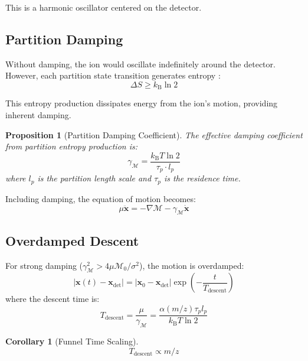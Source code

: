 \documentclass[twocolumn,10pt,a4paper]{article}
\newtheorem{proposition}[theorem]{Proposition}
\newtheorem{corollary}[theorem]{Corollary}
\theoremstyle{definition}
\theoremstyle{remark}
\newcommand{\kB}{k_{\mathrm{B}}}
\newcommand{\Mdepth}{\mathcal{M}}
\newcommand{\partinert}{\mu}
\newcommand{\taup}{\tau_p}
\newcommand{\xdet}{\mathbf{x}_{\mathrm{det}}}
\begin{document}
This is a harmonic oscillator centered on the detector.

\subsection{Partition Damping}

Without damping, the ion would oscillate indefinitely around the detector. However, each partition state transition generates entropy \citep{landauer1961}:
\begin{equation}
    \Delta S \geq \kB \ln 2
    \label{eq:landauer}
\end{equation}

This entropy production dissipates energy from the ion's motion, providing inherent damping.

\begin{proposition}[Partition Damping Coefficient]
\label{prop:damping}
The effective damping coefficient from partition entropy production is:
\begin{equation}
    \gamma_{\Mdepth} = \frac{\kB T \ln 2}{\taup \cdot l_p}
    \label{eq:damping_coeff}
\end{equation}
where $l_p$ is the partition length scale and $\taup$ is the residence time.
\end{proposition}

Including damping, the equation of motion becomes:
\begin{equation}
    \partinert\ddot{\mathbf{x}} = -\nabla\Mdepth - \gamma_{\Mdepth}\dot{\mathbf{x}}
    \label{eq:damped_eom}
\end{equation}

\subsection{Overdamped Descent}

For strong damping ($\gamma_{\Mdepth}^2 > 4\partinert\Mdepth_0/\sigma^2$), the motion is overdamped:
\begin{equation}
    |\mathbf{x}(t) - \xdet| = |\mathbf{x}_0 - \xdet|\exp\left(-\frac{t}{T_{\mathrm{descent}}}\right)
    \label{eq:overdamped}
\end{equation}
where the descent time is:
\begin{equation}
    T_{\mathrm{descent}} = \frac{\partinert}{\gamma_{\Mdepth}} = \frac{\alpha(m/z)\taup l_p}{\kB T \ln 2}
    \label{eq:descent_time}
\end{equation}

\begin{corollary}[Funnel Time Scaling]
\begin{equation}
    \boxed{T_{\mathrm{descent}} \propto m/z}
\end{equation}
\end{corollary}
\end{document}
